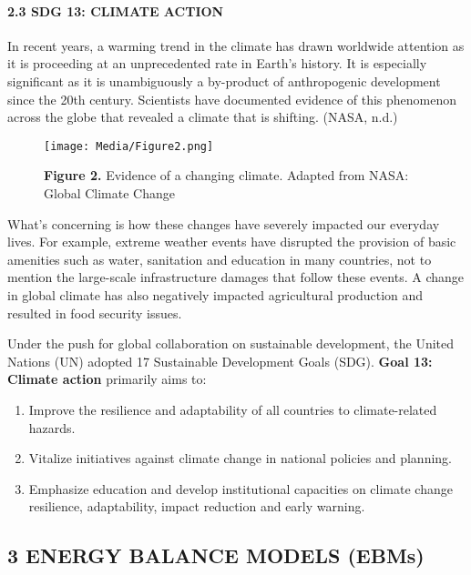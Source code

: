 \documentclass[
  letterpaper,
  DIV=11,
  numbers=noendperiod]{scrartcl}
\let\oldparagraph\paragraph
\renewcommand{\paragraph}[1]{\oldparagraph{#1}\mbox{}}
\providecommand{\tightlist}{%
  \setlength{\itemsep}{0pt}\setlength{\parskip}{0pt}}\usepackage{longtable,booktabs,array}
\begin{document}
\hypertarget{sdg-13-climate-action}{%
\paragraph{2.3 SDG 13: CLIMATE ACTION}\label{sdg-13-climate-action}}

In recent years, a warming trend in the climate has drawn worldwide
attention as it is proceeding at an unprecedented rate in Earth's
history. It is especially significant as it is unambiguously a
by-product of anthropogenic development since the 20th century.
Scientists have documented evidence of this phenomenon across the globe
that revealed a climate that is shifting. (NASA, n.d.)

\begin{figure}

{\centering \texttt{[image: Media/Figure2.png]}

}

\caption{\textbf{Figure 2.} Evidence of a changing climate. Adapted from
NASA: Global Climate Change}

\end{figure}

What's concerning is how these changes have severely impacted our
everyday lives. For example, extreme weather events have disrupted the
provision of basic amenities such as water, sanitation and education in
many countries, not to mention the large-scale infrastructure damages
that follow these events. A change in global climate has also negatively
impacted agricultural production and resulted in food security issues.

Under the push for global collaboration on sustainable development, the
United Nations (UN) adopted 17 Sustainable Development Goals (SDG).
\textbf{Goal 13: Climate action} primarily aims to:

\begin{enumerate}
\def\labelenumi{\arabic{enumi}.}
\tightlist
\item
  Improve the resilience and adaptability of all countries to
  climate-related hazards.
\item
  Vitalize initiatives against climate change in national policies and
  planning.
\item
  Emphasize education and develop institutional capacities on climate
  change resilience, adaptability, impact reduction and early warning.
\end{enumerate}

\hypertarget{energy-balance-models-ebms}{%
\subsection{3 \textbar{} ENERGY BALANCE MODELS
(EBMs)}\label{energy-balance-models-ebms}}
\end{document}
